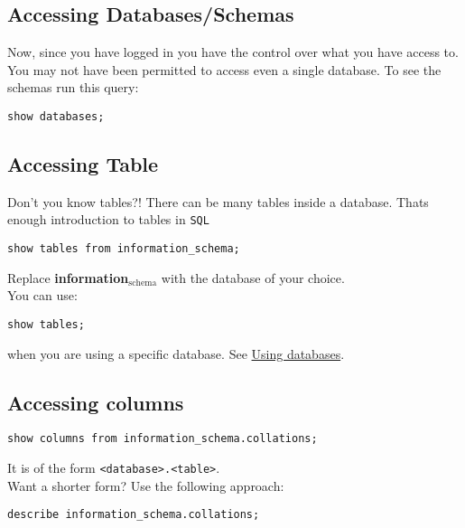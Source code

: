 \documentclass[11pt]{article}
\begin{document}
\subsection{Accessing Databases/Schemas}
\label{sec:orgheadline4}
Now, since you have logged in you have the control over what
you have access to. You may not have been permitted to access
even a single database. To see the schemas run this query:
\begin{verbatim}
show databases;
\end{verbatim}
\subsection{Accessing Table}
\label{sec:orgheadline6}
Don't you know tables?!
There can be many tables inside a database. Thats enough
introduction to tables in \texttt{SQL}
\begin{verbatim}
show tables from information_schema;
\end{verbatim}
Replace \textbf{information\(_{\text{schema}}\)} with the database of your
choice.\\
You can use:
\begin{verbatim}
show tables;
\end{verbatim}
when you are using a specific database. See \hyperref[sec:orgheadline5]{Using databases}.
\subsection{Accessing columns}
\label{sec:orgheadline8}
\begin{verbatim}
show columns from information_schema.collations;
\end{verbatim}
It is of the form \texttt{<database>.<table>}.\\
Want a shorter form? Use the following approach:
\begin{verbatim}
describe information_schema.collations;
\end{verbatim}
\end{document}
